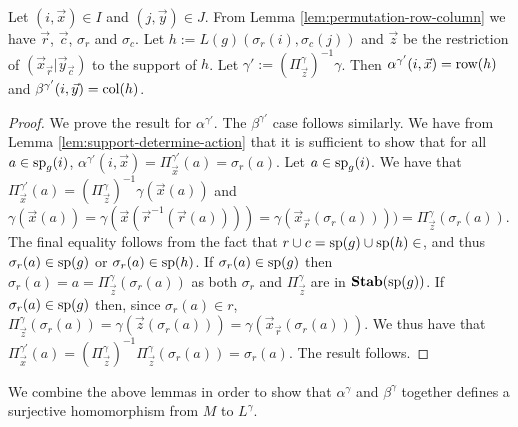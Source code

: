 \documentclass[../paper.tex]{subfiles}
\begin{document}
\begin{lem}
	\label{lem:defining-h-from-IJ}
	Let $(i, \vec{x}) \in I$ and $(j, \vec{y}) \in J$. From Lemma
	\ref{lem:permutation-row-column} we have $\vec{r}$, $\vec{c}$, $\sigma_r$ and
	$\sigma_c$. Let $h := L(g) (\sigma_r (i), \sigma_c (j))$ and $\vec{z}$ be the
	restriction of $(\vec{x}_{\vec{r}} \vert \vec{y}_{\vec{c}})$ to the support of
	$h$. Let $\gamma' := (\Pi^{\gamma}_{\vec{z}})^{-1} \gamma$. Then
	$\alpha^{\gamma'} (i, \vec{x}) = \text{row} (h)$ and $\beta^{\gamma'} (i,\vec{y}) =
	\text{col}(h)$.
\end{lem}
\begin{proof}
	We prove the result for $\alpha^{\gamma'}$. The $\beta^{\gamma'}$ case follows
	similarly. We have from Lemma \ref{lem:support-determine-action} that it is
	sufficient to show that for all $a \in \text{sp}_g(i)$, $\alpha^{\gamma'}(i,
	\vec{x}) = \Pi^{\gamma'}_{\vec{x}} (a) = \sigma_r (a)$. Let $a \in
	\text{sp}_g(i)$. We have that $\Pi^{\gamma'}_{\vec{x}} (a) =
	(\Pi^{\gamma}_{\vec{z}})^{-1} \gamma (\vec{x} (a))$ and $\gamma (\vec{x}(a)) =
	\gamma (\vec{x} (\vec{r}^{-1}(\vec{r}(a)))) = \gamma (\vec{x}_{\vec{r}}
	(\sigma_r(a)))) = \Pi^{\gamma}_{\vec{z}}(\sigma_r(a))$. The final equality
	follows from the fact that $r \cup c = \text{sp}(g) \cup \text{sp}(h)\in $, and thus
	$\sigma_r(a) \in \text{sp}(g)$ or $\sigma_r(a) \in \text{sp}(h)$. If $\sigma_r(a)
	\in \text{sp}(g)$ then $\sigma_r(a) = a = \Pi^{\gamma}_{\vec{z}}(\sigma_r(a))$ as
	both $\sigma_r$ and $\Pi^{\gamma}_{\vec{z}}$ are in $\text{\textbf{Stab}} (\text{sp} (g))$. If
	$\sigma_r(a) \in \text{sp}(g)$ then, since $\sigma_r(a) \in r$,
	$\Pi^{\gamma}_{\vec{z}}(\sigma_r(a)) = \gamma(\vec{z}(\sigma_r(a))) =
	\gamma(\vec{x}_{\vec{r}}(\sigma_r(a)))$. We thus have that
	$\Pi^{\gamma'}_{\vec{x}}(a) =
	(\Pi^{\gamma}_{\vec{z}})^{-1}\Pi^{\gamma}_{\vec{z}} (\sigma_r(a)) =
	\sigma_r(a)$. The result follows.
\end{proof}

We combine the above lemmas in order to show that $\alpha^{\gamma}$ and
$\beta^{\gamma}$ together defines a surjective homomorphism from $M$ to
$L^{\gamma}$.
\end{document}
